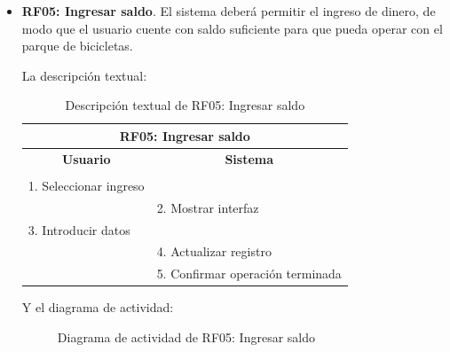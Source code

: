 \begin{itemize}
	\FloatBarrier
	\item \textbf{RF05: Ingresar saldo}. El sistema deberá permitir el ingreso de dinero, de modo que el usuario cuente con saldo suficiente para que pueda operar con el parque de bicicletas.
	
	La descripción textual:
	\begin{table}[h]
		\centering	
		\begin{tabular}{|l|l|}
			\hline
			\multicolumn{2}{|c|}{\textbf{RF05: Ingresar saldo}} \\ \hline
			\multicolumn{1}{|c|}{\textbf{Usuario}} & \multicolumn{1}{c|}{\textbf{Sistema}} \\ \hline
			[Pto. inclusión: RF02: Loguear usuario] &\\ \hline
			1. Seleccionar ingreso &\\ \hline
			& 2. Mostrar interfaz \\ \hline
			3. Introducir datos &\\ \hline
			& 4. Actualizar registro \\ \hline
			& 5. Confirmar operación terminada \\ \hline 	
		\end{tabular}
		\caption{Descripción textual de RF05: Ingresar saldo}
		\label{tab:tablaDescTextualRF05}
	\end{table}
	
	Y el diagrama de actividad:
	\begin{figure}[!htb]
		\centering
		\caption{Diagrama de actividad de RF05: Ingresar saldo}
		\label{fig:diagramaActividad_RF05}
	\end{figure}
	

\end{itemize}
